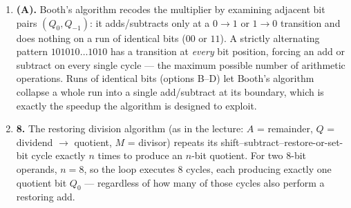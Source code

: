 \documentclass[11pt]{article}
\begin{document}
\begin{enumerate}
\item[\textbf{Q7}] \textbf{(A).} Booth's algorithm recodes the multiplier by examining adjacent bit pairs $(Q_0, Q_{-1})$: it adds/subtracts only at a $0\to1$ or $1\to0$ transition and does nothing on a run of identical bits ($00$ or $11$). A strictly alternating pattern $101010\ldots1010$ has a transition at \emph{every} bit position, forcing an add or subtract on every single cycle --- the maximum possible number of arithmetic operations. Runs of identical bits (options B--D) let Booth's algorithm collapse a whole run into a single add/subtract at its boundary, which is exactly the speedup the algorithm is designed to exploit.

\item[\textbf{Q8}] \textbf{8.} The restoring division algorithm (as in the lecture: $A$ = remainder, $Q$ = dividend $\to$ quotient, $M$ = divisor) repeats its shift--subtract--restore-or-set-bit cycle exactly $n$ times to produce an $n$-bit quotient. For two 8-bit operands, $n = 8$, so the loop executes 8 cycles, each producing exactly one quotient bit $Q_0$ --- regardless of how many of those cycles also perform a restoring add.
\end{enumerate}
\end{document}
